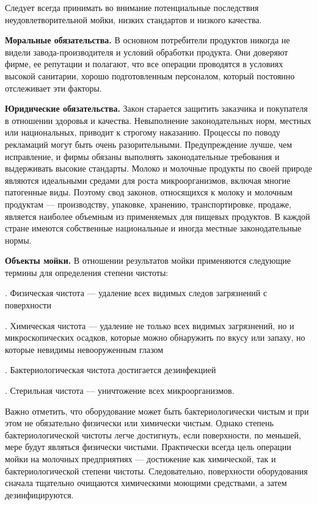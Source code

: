 {\par \redline	Следует всегда принимать во внимание потенциальные последствия неудовлетворительной мойки, низких стандартов и низкого качества.

\par \redline \textbf{Моральные обязательства.} В основном потребители продуктов никогда не видели завода-производителя и условий обработки продукта. Они доверяют фирме, ее репутации и полагают, что все операции проводятся в условиях высокой санитарии, хорошо подготовленным персоналом, который постоянно отслеживает эти факторы.

\par \redline \textbf{Юридические обязательства.} Закон старается защитить заказчика и покупателя в отношении здоровья и качества. Невыполнение законодательных норм, местных или национальных, приводит к строгому наказанию. Процессы по поводу рекламаций могут быть очень разорительными. Предупреждение лучше, чем исправление, и фирмы обязаны выполнять законодательные требования и выдерживать высокие стандарты. Молоко и молочные продукты по своей природе являются идеальными средами для роста микроорганизмов, включая многие патогенные виды. Поэтому свод законов, относящихся к молоку и молочным продуктам — производству, упаковке, хранению, транспортировке, продаже, является наиболее объемным из применяемых для пищевых продуктов. В каждой стране имеются собственные национальные и иногда местные законодательные нормы.


\par \redline \textbf{Объекты мойки.} В отношении результатов мойки применяются следующие термины для определения
степени чистоты:

\par {}. Физическая чистота — удаление всех видимых следов загрязнений с поверхности
\par {}. Химическая чистота — удаление не только всех видимых загрязнений, но и микроскопических осадков, которые можно обнаружить по вкусу или запаху, но которые невидимы невооруженным глазом
\par {}. Бактериологическая чистота достигается дезинфекцией
\par {}. Стерильная чистота — уничтожение всех микроорганизмов.

\par \redline Важно отметить, что оборудование может быть бактериологически чистым и при этом не
обязательно физически или химически чистым. Однако степень бактериологической чистоты
легче достигнуть, если поверхности, по меньшей, мере будут являться физически чистыми.
Практически всегда цель операции мойки на молочных предприятиях — достижение как
химической, так и бактериологической степени чистоты. Следовательно, поверхности
оборудования сначала тщательно очищаются химическими моющими средствами, а затем
дезинфицируются.


}
